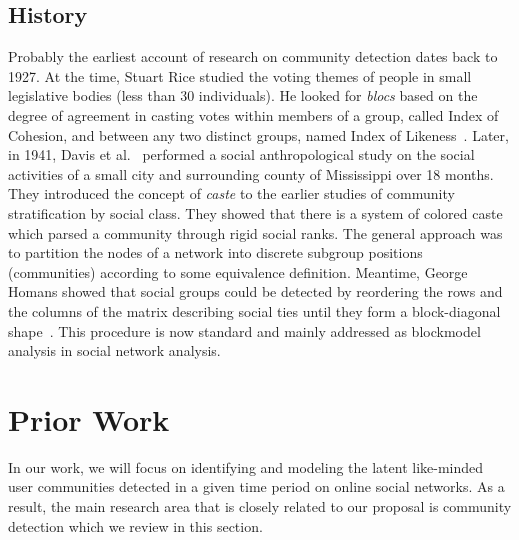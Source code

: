 \documentclass[sigconf]{acmart}
\begin{document}
\subsection{History}
Probably the earliest account of research on community detection dates back to 1927. At the time, Stuart Rice studied the voting themes of people in small legislative bodies (less than 30 individuals). He looked for \textit{blocs} based on the degree of agreement in casting votes within members of a group, called Index of Cohesion, and between any two distinct groups, named Index of Likeness~\cite{10.2307/1945514}. Later, in 1941, Davis et al.~\cite{davis1941deep} performed a social anthropological study on the social activities of a small city and surrounding county of Mississippi over 18 months. They introduced the concept of \textit{caste} to the earlier studies of community stratification by social class. They showed that there is a system of colored caste which parsed a community through rigid social ranks. The general approach was to partition the nodes of a network into discrete subgroup positions (communities) according to some equivalence definition. Meantime, George Homans showed that social groups could be detected by reordering the rows and the columns of the matrix describing social ties until they form a block-diagonal shape~\cite{homans2013human}. This procedure is now standard and mainly addressed as blockmodel analysis in social network analysis. 

\section{Prior Work}
In our work, we will focus on identifying and modeling the latent like-minded user communities detected in a given time period on online social networks. As a result, the main research area that is closely related to our proposal is community detection which we review in this section. 
\end{document}
